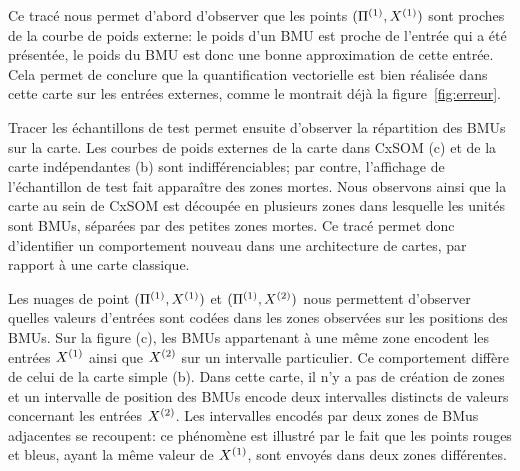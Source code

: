 Ce tracé nous permet d'abord d'observer que les points $(\Pi^{({1})},X^{({1})})$ sont proches de la courbe de poids externe: le poids d'un BMU est proche de l'entrée qui a été présentée, le poids du BMU est donc une bonne approximation de cette entrée. Cela permet de conclure que la quantification vectorielle est bien réalisée dans cette carte sur les entrées externes, comme le montrait déjà la figure~\ref{fig:erreur}.

Tracer les échantillons de test permet ensuite d'observer la répartition des BMUs sur la carte. Les courbes de poids externes de la carte dans CxSOM (c) et de la carte indépendantes (b) sont indifférenciables; par contre, l'affichage de l'échantillon de test fait apparaître des zones mortes. Nous observons ainsi que la carte au sein de CxSOM est découpée en plusieurs zones dans lesquelle les unités sont BMUs, séparées par des petites zones mortes. Ce tracé permet donc d'identifier un comportement nouveau dans une architecture de cartes, par rapport à une carte classique.

Les nuages de point $(\Pi^{({1})},X^{({1})})$ et $(\Pi^{({1})},X^{({2})})$ nous permettent d'observer quelles valeurs d'entrées sont codées dans les zones observées sur les positions des BMUs. Sur la figure (c), les BMUs appartenant à une même zone encodent les entrées $X^{({1})}$ ainsi que $X^{({2})}$ sur un intervalle particulier. Ce comportement diffère de celui de la carte simple (b). Dans cette carte, il n'y a pas de création de zones et un intervalle de position des BMUs encode deux intervalles distincts de valeurs concernant les entrées $X^{({2})}$.
Les intervalles encodés par deux zones de BMus adjacentes se recoupent: ce phénomène est illustré par le fait que les points rouges et bleus, ayant la même valeur de $X^{({1})}$, sont envoyés dans deux zones différentes.



